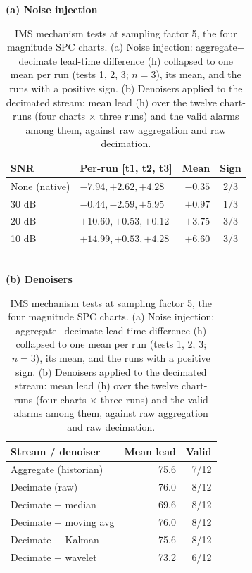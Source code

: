 \begin{table}[t] \footnotesize
	\setlength{\tabcolsep}{4pt}
	\begin{center}
	\caption{IMS mechanism tests at sampling factor 5, the four magnitude SPC charts. (a) Noise injection: aggregate$-$decimate lead-time difference (h) collapsed to one mean per run (tests 1, 2, 3; $n=3$), its mean, and the runs with a positive sign. (b) Denoisers applied to the decimated stream: mean lead (h) over the twelve chart-runs (four charts $\times$ three runs) and the valid alarms among them, against raw aggregation and raw decimation.}
	\label{tab:mechanism}
	\textbf{(a) Noise injection}\\[2pt]
	\begin{tabular}{l l r c}
		\hline \hline
		\textbf{SNR} & \textbf{Per-run [t1, t2, t3]} & \textbf{Mean} & \textbf{Sign} \\
		\hline
		None (native) & $-7.94, +2.62, +4.28$ & $-0.35$ & 2/3 \\
		30 dB & $-0.44, -2.59, +5.95$ & $+0.97$ & 1/3 \\
		20 dB & $+10.60, +0.53, +0.12$ & $+3.75$ & 3/3 \\
		10 dB & $+14.99, +0.53, +4.28$ & $+6.60$ & 3/3 \\
		\hline \hline
	\end{tabular}
	\\[6pt]\textbf{(b) Denoisers}\\[2pt]
	\begin{tabular}{l r r}
		\hline \hline
		\textbf{Stream / denoiser} & \textbf{Mean lead} & \textbf{Valid} \\
		\hline
		Aggregate (historian) & 75.6 & 7/12 \\
		Decimate (raw) & 76.0 & 8/12 \\
		Decimate + median & 69.6 & 8/12 \\
		Decimate + moving avg & 76.0 & 8/12 \\
		Decimate + Kalman & 75.6 & 8/12 \\
		Decimate + wavelet & 73.2 & 6/12 \\
		\hline \hline
	\end{tabular}
	\end{center}
\end{table}
